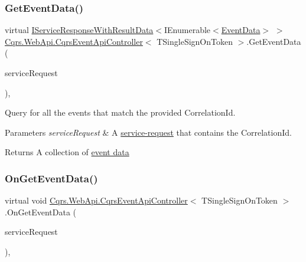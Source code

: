 \subsubsection{\texorpdfstring{Get\+Event\+Data()}{GetEventData()}}
{\footnotesize\ttfamily virtual \hyperlink{interfaceCqrs_1_1Services_1_1IServiceResponseWithResultData}{I\+Service\+Response\+With\+Result\+Data}$<$I\+Enumerable$<$\hyperlink{classCqrs_1_1Events_1_1EventData}{Event\+Data}$>$ $>$ \hyperlink{classCqrs_1_1WebApi_1_1CqrsEventApiController}{Cqrs.\+Web\+Api.\+Cqrs\+Event\+Api\+Controller}$<$ T\+Single\+Sign\+On\+Token $>$.Get\+Event\+Data (\begin{DoxyParamCaption}\item[{\hyperlink{interfaceCqrs_1_1Services_1_1IServiceRequestWithData}{I\+Service\+Request\+With\+Data}$<$ T\+Single\+Sign\+On\+Token, Guid $>$}]{service\+Request }\end{DoxyParamCaption})\hspace{0.3cm}{\ttfamily [protected]}, {\ttfamily [virtual]}}



Query for all the events that match the provided Correlation\+Id. 


\begin{DoxyParams}{Parameters}
{\em service\+Request} & A \hyperlink{}{service-\/request} that contains the Correlation\+Id.\\
\hline
\end{DoxyParams}
\begin{DoxyReturn}{Returns}
A collection of \hyperlink{}{event data}
\end{DoxyReturn}
\mbox{\label{classCqrs_1_1WebApi_1_1CqrsEventApiController_a705b40b973640de14f7b8b7b4c6eb1fe_a705b40b973640de14f7b8b7b4c6eb1fe}} 
\subsubsection{\texorpdfstring{On\+Get\+Event\+Data()}{OnGetEventData()}}
{\footnotesize\ttfamily virtual void \hyperlink{classCqrs_1_1WebApi_1_1CqrsEventApiController}{Cqrs.\+Web\+Api.\+Cqrs\+Event\+Api\+Controller}$<$ T\+Single\+Sign\+On\+Token $>$.On\+Get\+Event\+Data (\begin{DoxyParamCaption}\item[{\hyperlink{interfaceCqrs_1_1Services_1_1IServiceRequestWithData}{I\+Service\+Request\+With\+Data}$<$ T\+Single\+Sign\+On\+Token, Guid $>$}]{service\+Request }\end{DoxyParamCaption})\hspace{0.3cm}{\ttfamily [protected]}, {\ttfamily [virtual]}}

